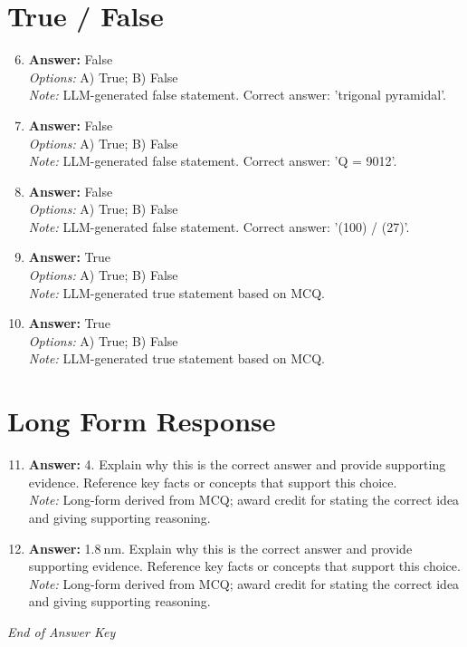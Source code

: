 \documentclass[12pt]{article}
\begin{document}
\section*{True / False}
\begin{enumerate}[label=\arabic*.]
\setcounter{enumi}{5}
\item \textbf{Answer:} False
\\ \textit{Options:} A) True; B) False
\\ \textit{Note:} LLM-generated false statement. Correct answer: 'trigonal pyramidal'.
\item \textbf{Answer:} False
\\ \textit{Options:} A) True; B) False
\\ \textit{Note:} LLM-generated false statement. Correct answer: 'Q = 9012'.
\item \textbf{Answer:} False
\\ \textit{Options:} A) True; B) False
\\ \textit{Note:} LLM-generated false statement. Correct answer: '(100) / (27)'.
\item \textbf{Answer:} True
\\ \textit{Options:} A) True; B) False
\\ \textit{Note:} LLM-generated true statement based on MCQ.
\item \textbf{Answer:} True
\\ \textit{Options:} A) True; B) False
\\ \textit{Note:} LLM-generated true statement based on MCQ.
\end{enumerate}

\section*{Long Form Response}
\begin{enumerate}[label=\arabic*.]
\setcounter{enumi}{10}
\item \textbf{Answer:} 4. Explain why this is the correct answer and provide supporting evidence. Reference key facts or concepts that support this choice.
\\ \textit{Note:} Long-form derived from MCQ; award credit for stating the correct idea and giving supporting reasoning.
\item \textbf{Answer:} 1.8$\mathrm{~nm}$. Explain why this is the correct answer and provide supporting evidence. Reference key facts or concepts that support this choice.
\\ \textit{Note:} Long-form derived from MCQ; award credit for stating the correct idea and giving supporting reasoning.
\end{enumerate}

\vfill
\noindent\textit{End of Answer Key}
\end{document}
